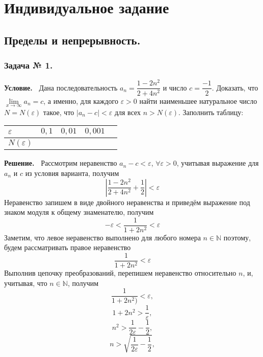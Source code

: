 \documentclass[12pt]{article}
\begin{document}
\section{Индивидуальное задание}
%
\subsection{Пределы и непрерывность.}
\subsubsection*{\center Задача № 1.}
{\bf Условие.~}
Дана последовательность $a_{n}=\dfrac{1-2n^2}{2+4n^2}$ и число $c=\dfrac{-1}{2}$. Доказать, что $\lim\limits_{x\rightarrow\infty} a_{n}=c $, а именно, для каждого $\varepsilon>0$ найти наименьшее натуральное число  $N{=}N(\varepsilon)$ такое, что $|a_{n}-c|<\varepsilon$ для всех $n>N(\varepsilon)$. Заполнить таблицу: 
\begin{center}
\begin{tabular}{ | p{25pt} | c | c | c | c |}
\hline
$\varepsilon$& $0{,}1$ & $0{,}01$ & $0{,}001$ \\ \hline
$N(\varepsilon)$ &   &   &\\
\hline
\end{tabular}
\end{center}
\medskip
{\bf Решение.~}
Рассмотрим неравенство $a_{n}-c<\varepsilon$, $\forall\varepsilon>0$, учитывая выражение для $a_{n}$ и $c$ из условия варианта, получим 
$$\left|\frac{1-2n^2}{2+4n^2}+\frac{1}{2}\right|<\varepsilon$$
Неравенство запишем в виде двойного неравенства и приведём выражение под знаком модуля к общему знаменателю, получим
$${-}\varepsilon <\dfrac{1}{1+2n^2}<\varepsilon$$
Заметим, что левое неравенство выполнено для любого номера $n\in \mathbb{N}$ поэтому, будем рассматривать правое неравенство
$$\frac{1}{1+2n^2}<\varepsilon$$
Выполнив цепочку преобразований, перепишем неравенство относительно $n$, и, учитывая, что $n\in \mathbb{N}$, получим 
$$\dfrac{1}{1+2n^2)}<\varepsilon,$$
$$1+2n^2>\dfrac{1}{\varepsilon},$$
$$n^2>\dfrac{1}{2\varepsilon}-\dfrac{1}{2},$$
$$n>\sqrt{\dfrac{1}{2\varepsilon}-\dfrac{1}{2}},$$
\end{document}
